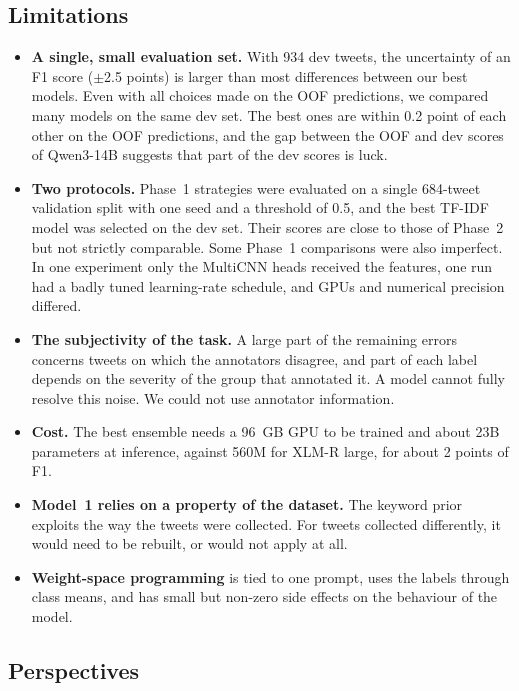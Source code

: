 \documentclass[pdflatex,sn-mathphys-num]{sn-jnl}
\begin{document}
\subsection{Limitations}

\begin{itemize}
\item \textbf{A single, small evaluation set.} With 934 dev tweets, the uncertainty of an F1 score ($\pm$2.5 points) is larger than most differences between our best models. Even with all choices made on the OOF predictions, we compared many models on the same dev set. The best ones are within 0.2 point of each other on the OOF predictions, and the gap between the OOF and dev scores of Qwen3-14B suggests that part of the dev scores is luck.
\item \textbf{Two protocols.} Phase~1 strategies were evaluated on a single 684-tweet validation split with one seed and a threshold of 0.5, and the best TF-IDF model was selected on the dev set. Their scores are close to those of Phase~2 but not strictly comparable. Some Phase~1 comparisons were also imperfect. In one experiment only the MultiCNN heads received the features, one run had a badly tuned learning-rate schedule, and GPUs and numerical precision differed.
\item \textbf{The subjectivity of the task.} A large part of the remaining errors concerns tweets on which the annotators disagree, and part of each label depends on the severity of the group that annotated it. A model cannot fully resolve this noise. We could not use annotator information.
\item \textbf{Cost.} The best ensemble needs a 96~GB GPU to be trained and about 23B parameters at inference, against 560M for XLM-R large, for about 2 points of F1.
\item \textbf{Model~1 relies on a property of the dataset.} The keyword prior exploits the way the tweets were collected. For tweets collected differently, it would need to be rebuilt, or would not apply at all.
\item \textbf{Weight-space programming} is tied to one prompt, uses the labels through class means, and has small but non-zero side effects on the behaviour of the model.
\end{itemize}

\subsection{Perspectives}
\end{document}
